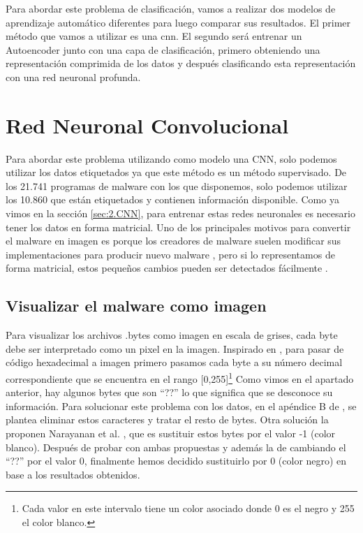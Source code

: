  


Para abordar este problema de clasificación, vamos a realizar dos modelos de aprendizaje automático diferentes para luego comparar sus resultados. El primer método que vamos a utilizar es una \acrfull{cnn}. El segundo será entrenar un Autoencoder junto con una capa de clasificación, primero obteniendo una representación comprimida de los datos y después clasificando esta representación con una red neuronal profunda. 
 







\section{Red Neuronal Convolucional}

Para abordar este problema utilizando como modelo una CNN, solo podemos utilizar los datos etiquetados ya que este método es un método supervisado. De los 21.741 programas de malware con los que disponemos, solo podemos utilizar los 10.860 que están etiquetados y contienen información disponible. Como ya vimos en la sección \ref{sec:2.CNN}, para entrenar estas redes neuronales es necesario tener los datos en forma matricial. Uno de los principales motivos para convertir el malware en imagen es porque los creadores de malware suelen modificar sus implementaciones para producir nuevo malware \citep{nataraj2015sattva}, pero si lo representamos de forma matricial, estos pequeños cambios pueden ser detectados fácilmente \citep{kalash2018malware}.

\subsection{Visualizar el malware como imagen}
Para visualizar los archivos .bytes como imagen en escala de grises, cada byte debe ser interpretado como un pixel en la imagen. Inspirado en \citep{nataraj2011malware}, para pasar de código hexadecimal a imagen primero pasamos cada byte a su número decimal correspondiente que se encuentra en el rango [0,255]\footnote{Cada valor en este intervalo tiene un color asociado donde 0 es el negro y 255 el color blanco.} Como vimos en el apartado anterior, hay algunos bytes que son ``??'' lo que significa que se desconoce su información. Para solucionar este problema con los datos, en el apéndice B de \citep{geron2022hands}, se plantea eliminar estos caracteres y tratar el resto de bytes. Otra solución la proponen Narayanan et al. \citep{narayanan2016performance}, que es sustituir estos bytes por el valor -1 (color blanco). Después de probar con ambas propuestas y además la de cambiando el ``??'' por el valor 0, finalmente hemos decidido sustituirlo por 0 (color negro) en base a los resultados obtenidos. 

